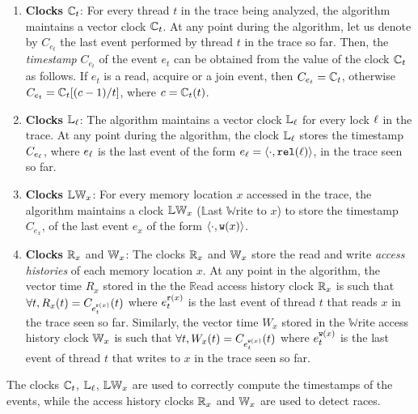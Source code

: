 \begin{enumerate}
\item \textbf{Clocks} $\mathbb{C}_t$: For every thread $t$ in the trace
being analyzed, the algorithm maintains a vector clock $\mathbb{C}_t$.
At any point during the algorithm, 
let us denote by $C_{e_t}$ the last event performed by thread
$t$ in the trace so far.
Then, the \emph{timestamp} $C_{e_t}$ 
of the event $e_t$ can be obtained from the value of the clock $\mathbb{C}_t$ as follows.
If $e_t$ is a read, acquire or a join event, then $C_{e_t} = \mathbb{C}_t$, 
otherwise $C_{e_t} = \mathbb{C}_t[(c-1)/t]$, where $c = \mathbb{C}_t(t)$.

\item \textbf{Clocks} $\mathbb{L}_\ell$: The algorithm maintains
a vector clock $\mathbb{L}_\ell$ for every lock $\ell$ in the trace.
At any point during the algorithm, the clock $\mathbb{L}_\ell$ stores the
timestamp $C_{e_\ell}$, where $e_\ell$ is the last event of the form
$e_\ell = \langle \cdot, \mathtt{rel}(\ell)\rangle$, in the trace seen so far. 

\item \textbf{Clocks} $\mathbb{LW}_x$: For every memory location $x$
accessed in the trace, the algorithm maintains a clock $\mathbb{LW}_x$ ($\mathbb{L}$ast $\mathbb{W}$rite to $x$)
to store the timestamp $C_{e_x}$, of the last event $e_x$ 
of the form $\langle \cdot, \mathtt{w}(x)\rangle$.

\item \textbf{Clocks} $\mathbb{R}_x$ and $\mathbb{W}_x$: The clocks
$\mathbb{R}_x$ and $\mathbb{W}_x$ store the read and write \emph{access histories} of
each memory location $x$.
At any point in the algorithm,
the vector time $R_x$ stored in the 
the $\mathbb{R}$ead access history clock $\mathbb{R}_x$ is
such that $\forall t, R_x(t) = C_{e_t^{\mathtt{r}(x)}}(t)$ where 
$e_t^{\mathtt{r}(x)}$ is the last event of thread $t$ that reads $x$ in 
the trace seen so far.
Similarly, the vector time $W_x$ stored in the $\mathbb{W}$rite access history
clock $\mathbb{W}_x$ is such that $\forall t, W_x(t) = C_{e_t^{\mathtt{w}(x)}}(t)$ where $e_t^{\mathtt{w}(x)}$ 
is the last event of thread $t$ that writes to $x$ in 
the trace seen so far.
\end{enumerate}

The clocks $\mathbb{C}_t$, $\mathbb{L}_\ell$, $\mathbb{LW}_x$ are used to correctly compute the
timestamps of the events, while the access history clocks $\mathbb{R}_x$ and $\mathbb{W}_x$
are used to detect races.


